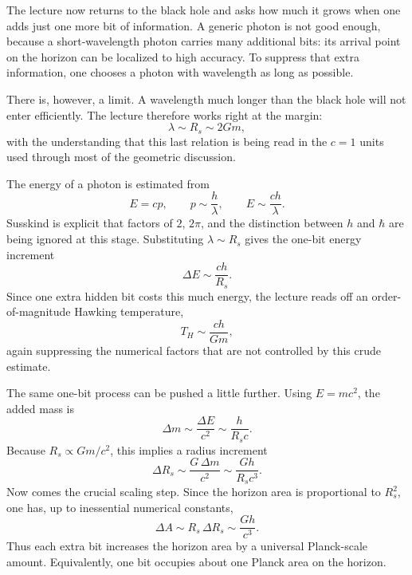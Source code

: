 The lecture now returns to the black hole and asks how much it grows when one adds just one more bit of information. A generic photon is not good enough, because a short-wavelength photon carries many additional bits: its arrival point on the horizon can be localized to high accuracy. To suppress that extra information, one chooses a photon with wavelength as long as possible.

There is, however, a limit. A wavelength much longer than the black hole will not enter efficiently. The lecture therefore works right at the margin:
\begin{equation}
\lambda \sim R_s \sim 2Gm,
\end{equation}
with the understanding that this last relation is being read in the \(c=1\) units used through most of the geometric discussion.

The energy of a photon is estimated from
\begin{equation}
E=cp,
\qquad
p\sim \frac{h}{\lambda},
\qquad
E\sim \frac{ch}{\lambda}.
\end{equation}
Susskind is explicit that factors of \(2\), \(2\pi\), and the distinction between \(h\) and \(\hbar\) are being ignored at this stage. Substituting \(\lambda\sim R_s\) gives the one-bit energy increment
\begin{equation}
\Delta E \sim \frac{ch}{R_s}.
\end{equation}
Since one extra hidden bit costs this much energy, the lecture reads off an order-of-magnitude Hawking temperature,
\begin{equation}
T_H \sim \frac{ch}{Gm},
\end{equation}
again suppressing the numerical factors that are not controlled by this crude estimate.

The same one-bit process can be pushed a little further. Using \(E=mc^2\), the added mass is
\begin{equation}
\Delta m \sim \frac{\Delta E}{c^2} \sim \frac{h}{R_s c}.
\end{equation}
Because \(R_s\propto Gm/c^2\), this implies a radius increment
\begin{equation}
\Delta R_s \sim \frac{G\,\Delta m}{c^2}
\sim
\frac{Gh}{R_s c^3}.
\end{equation}
Now comes the crucial scaling step. Since the horizon area is proportional to \(R_s^2\), one has, up to inessential numerical constants,
\begin{equation}
\Delta A \sim R_s\,\Delta R_s \sim \frac{Gh}{c^3}.
\end{equation}
Thus each extra bit increases the horizon area by a universal Planck-scale amount. Equivalently, one bit occupies about one Planck area on the horizon.

